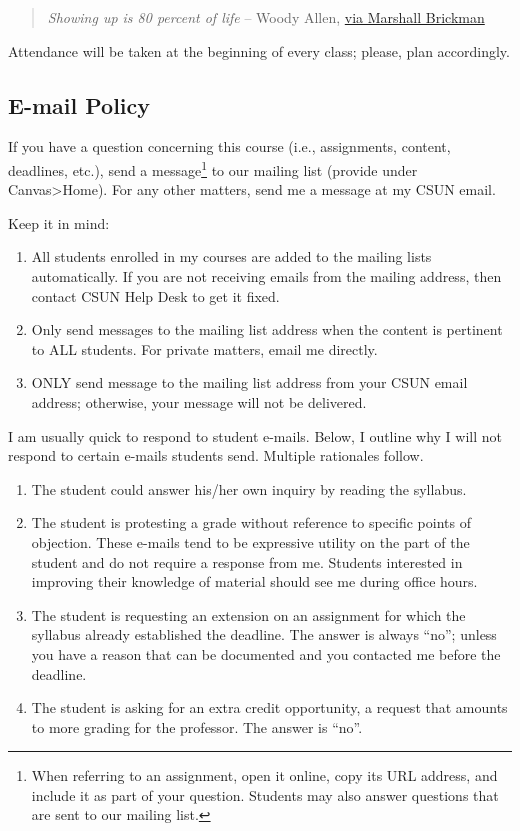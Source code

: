 \documentclass[11pt,]{article}
\providecommand{\tightlist}{%
  \setlength{\itemsep}{0pt}\setlength{\parskip}{0pt}}
\begin{document}
\begin{quote}
\emph{Showing up is 80 percent of life} -- Woody Allen,
\href{http://quoteinvestigator.com/2013/06/10/showing-up/\#note-6553-1}{via
Marshall Brickman}
\end{quote}

Attendance will be taken at the beginning of every class; please, plan
accordingly.

\hypertarget{e-mail-policy}{%
\subsection{E-mail Policy}\label{e-mail-policy}}

If you have a question concerning this course (i.e., assignments,
content, deadlines, etc.), send a message\footnote{When referring to an
  assignment, open it online, copy its URL address, and include it as
  part of your question. Students may also answer questions that are
  sent to our mailing list.} to our mailing list (provide under
Canvas\textgreater Home). For any other matters, send me a message at my
CSUN email.

Keep it in mind:

\begin{enumerate}
\def\labelenumi{\arabic{enumi}.}
\tightlist
\item
  All students enrolled in my courses are added to the mailing lists
  automatically. If you are not receiving emails from the mailing
  address, then contact CSUN Help Desk to get it fixed.
\item
  Only send messages to the mailing list address when the content is
  pertinent to ALL students. For private matters, email me directly.
\item
  ONLY send message to the mailing list address from your CSUN email
  address; otherwise, your message will not be delivered.
\end{enumerate}

I am usually quick to respond to student e-mails. Below, I outline why I
will not respond to certain e-mails students send. Multiple rationales
follow.

\begin{enumerate}
\def\labelenumi{\arabic{enumi}.}
\tightlist
\item
  The student could answer his/her own inquiry by reading the syllabus.
\item
  The student is protesting a grade without reference to specific points
  of objection. These e-mails tend to be expressive utility on the part
  of the student and do not require a response from me. Students
  interested in improving their knowledge of material should see me
  during office hours.
\item
  The student is requesting an extension on an assignment for which the
  syllabus already established the deadline. The answer is always
  ``no''; unless you have a reason that can be documented and you
  contacted me before the deadline.
\item
  The student is asking for an extra credit opportunity, a request that
  amounts to more grading for the professor. The answer is ``no''.
\end{enumerate}
\end{document}
